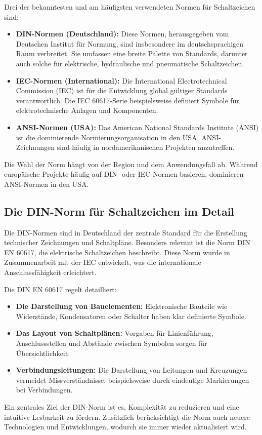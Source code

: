 Drei der bekanntesten und am häufigsten verwendeten Normen für Schaltzeichen sind:
\begin{itemize}
\item \textbf{DIN-Normen (Deutschland): }Diese Normen, herausgegeben vom Deutschen Institut für Normung, sind insbesondere im deutschsprachigen Raum verbreitet. Sie umfassen eine breite Palette von Standards, darunter auch solche für elektrische, hydraulische und pneumatische Schaltzeichen.
\item \textbf{IEC-Normen (International):} Die International Electrotechnical Commission (IEC) ist für die Entwicklung global gültiger Standards verantwortlich. Die IEC 60617-Serie beispielsweise definiert Symbole für elektrotechnische Anlagen und Komponenten.
\item \textbf{ANSI-Normen (USA): }Das American National Standards Institute (ANSI) ist die dominierende Normierungsorganisation in den USA. ANSI-Zeichnungen sind häufig in nordamerikanischen Projekten anzutreffen.
\end{itemize}
Die Wahl der Norm hängt von der Region und dem Anwendungsfall ab. Während europäische Projekte häufig auf DIN- oder IEC-Normen basieren, dominieren ANSI-Normen in den USA.

\subsection*{Die DIN-Norm für Schaltzeichen im Detail}

Die DIN-Normen sind in Deutschland der zentrale Standard für die Erstellung technischer Zeichnungen und Schaltpläne. Besonders relevant ist die Norm DIN EN 60617, die elektrische Schaltzeichen beschreibt. Diese Norm wurde in Zusammenarbeit mit der IEC entwickelt, was die internationale Anschlussfähigkeit erleichtert.

Die DIN EN 60617 regelt detailliert:
\begin{itemize}
	\item \textbf{Die Darstellung von Bauelementen:} Elektronische Bauteile wie Widerstände, Kondensatoren oder Schalter haben klar definierte Symbole.
	\item \textbf{Das Layout von Schaltplänen:} Vorgaben für Linienführung, Anschlussstellen und Abstände zwischen Symbolen sorgen für Übersichtlichkeit.
	\item \textbf{Verbindungsleitungen:} Die Darstellung von Leitungen und Kreuzungen vermeidet Missverständnisse, beispielsweise durch eindeutige Markierungen bei Verbindungen.
\end{itemize}
Ein zentrales Ziel der DIN-Norm ist es, Komplexität zu reduzieren und eine intuitive Lesbarkeit zu fördern. Zusätzlich berücksichtigt die Norm auch neuere Technologien und Entwicklungen, wodurch sie immer wieder aktualisiert wird.

